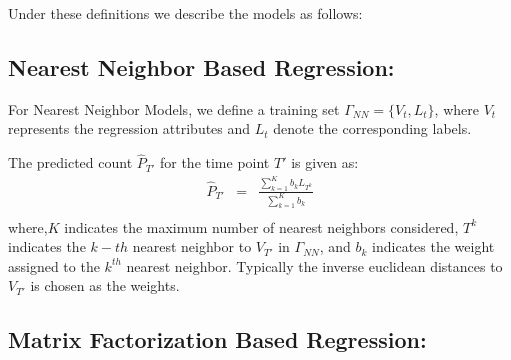Under these definitions we describe the models as follows:

\subsection{\label{sec:model:nearestneighbor} Nearest Neighbor Based
Regression:}
For Nearest Neighbor Models, we define a training set $\Gamma_{NN}
= \lbrace V_t, L_t \rbrace$, where $V_t$ represents the regression attributes
and $L_t$ denote the corresponding labels. 

The predicted count $\widehat{P}_{T'}$ for the time point $T'$ is given as:
\begin{equation} \label{eq:nearestneighbor:pred}
  \begin{array}{lcl}
  \widehat{P}_{T'} & = & \frac{\sum\limits_{k=1}^{K} b_{k}L_{T^k}}{\sum\limits_{k=1}^{K} b_{k}}\\
  \end{array}
\end{equation}
where,$K$ indicates the maximum number of nearest neighbors considered, $T^k$
indicates the $k-th$ nearest neighbor to $V_{T'}$ in $\Gamma_{NN}$, and $b_k$
indicates the weight assigned to the $k^{th}$ nearest neighbor. Typically the 
inverse euclidean distances to $V_{T'}$ is chosen as the weights.

\subsection{\label{sec:model:matrixfactor} Matrix Factorization Based
Regression:}

